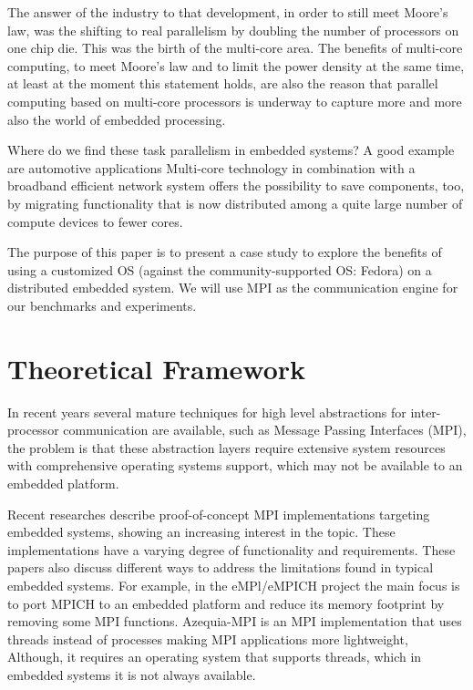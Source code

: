 \documentclass[a4paper]{article}
\begin{document}
The answer of the industry to that development, in order to still meet Moore’s
law, was the shifting to real parallelism by doubling the number of processors
on one chip die. This was the birth of the multi-core area. The benefits of
multi-core computing, to meet Moore’s law and to limit the power density at the
same time, at least at the moment this statement holds, are also the reason that
parallel computing based on multi-core processors is underway to capture more
and more also the world of embedded processing.\cite{MATTSON}

Where do we find these task parallelism in embedded systems? A good example are
automotive applications Multi-core technology in combination with a broadband
efficient network system offers the possibility to save components, too, by
migrating functionality that is now distributed among a quite large number of
compute devices to fewer cores.

The purpose of this paper is to present a case study to explore the benefits of 
using a customized OS (against the community-supported OS: Fedora) on a 
distributed embedded system. We will use MPI as the communication engine for our 
benchmarks and experiments. 


\section{Theoretical Framework}

In recent years several mature techniques for high level abstractions for
inter-processor communication are available, such as Message Passing Interfaces
(MPI), the problem is that these abstraction layers require extensive
system resources with comprehensive operating systems support, which may not be
available to an embedded platform.

Recent researches \cite{Saldana} \cite{Gallego} \cite{McMahon} describe
proof-of-concept MPI implementations targeting embedded systems, showing an
increasing interest in the topic. These implementations have a varying degree of
functionality and requirements. These papers also discuss different ways to
address the limitations found in typical embedded systems. For example, in the
eMPl/eMPICH project \cite{McMahon} the main focus is to port MPICH to an
embedded platform and reduce its memory footprint by removing some MPI
functions. Azequia-MPI \cite{Gallego} is an MPI implementation that uses threads
instead of processes making MPI applications more lightweight, Although, it
requires an operating system that supports threads, which in embedded systems it
is not always available. 
\end{document}

